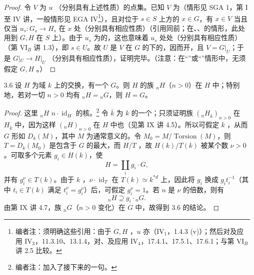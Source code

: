 \begin{proof}
令 $V$ 为 $u$ （分别具有上述性质）的点集。已知 $V$ 为（情形见 SGA 1，第 I 至 IV 讲，一般情形见 EGA IV\footnote[14]{编者注：须明确这些引用：由于 $G,H$ ，$u$ 亦（IV$_1$，1.4.3 (v)）；然后对及应用 IV$_3$，11.3.10、13.1.4，对、及应用 IV$_4$，17.4.1、17.5.1、17.6.1；与第 VI$_B$ 讲 2.5 比较。}），且对位于 $s\in S$ 上方的 $x\in G$，有 $x\in V$ 当且仅当 $u_s:G_s\to H_s$ 在 $x$ 处（分别具有相应性质）（引用同前；在、、的情形，此处用到 $G,H$ 在 $S$ 上）。由于 $u_s$ 为的，这也意味着 $u_s$ 处处（分别具有相应性质）（第 VI$_B$ 讲 1.3），即 $s\in U$。故 $U$ 是 $V$ 在 $G$ 的下的，因而开，且 $V=G|_U$；于是 $G|_U\to H|_U$ （分别具有相应性质），证明完毕。（注意：在“”或“”情形中，无须假定 $G,H$ 。）
\end{proof}
\begin{SGAresult}{}{3.6}
设 $H$ 为域 $k$ 上的交换，有一个 $G$。则 $H$ 的族 ${}_nH$（$n>0$）在 $H$ 中；特别地，若对一切 $n>0$ 均有 ${}_nH={}_nG$，则 $H=G$。
\end{SGAresult}
\begin{proof}
这里 ${}_nH$  $n\cdot\operatorname{id}_H$ 的核。\footnote[15]{编者注：加入了接下来的一句。} 令 $\bar k$ 为 $k$ 的一个；只须证明族 $({}_nH_{\bar k})_{n>0}$ 在 $H_{\bar k}$ 中，因为这样 $({}_nH)_{n>0}$ 在 $H$ 中也（见第 IX 讲 4.5）。所以可假定 $k$ ，从而 $G$ 形如 $D_k(M)$，其中 $M$ 为通常意义的。令 $M_0=M/\operatorname{Torsion}(M)$，则 $T=D_k(M_0)$ 是包含于 $G$ 的最大，而 $H/T$ ，故 $H(k)/T(k)$ 被某个数 $\nu>0$ 。可取多个元素 $g_i\in H(k)$，使
\[
H=\coprod_i g_i\cdot G,
\]
并有 $g_i^\nu\in T(k)$。由于 $k$ ，$\nu\cdot\operatorname{id}_T$ 在 $T(k)\simeq k^{*d}$ 上，因此将 $g_i$ 换成 $g_it_i^{-1}$（其中 $t_i\in T(k)$ 满足 $t_i^\nu=g_i^\nu$）后，可假定 $g_i^\nu=1$。若 $n$ 是 $\nu$ 的倍数，则有
\[
{}_nH\supseteq g_i\cdot{}_nG.
\]
由第 IX 讲 4.7，族 ${}_nG$（$n>0$ 变化）在 $G$ 中，故得到 3.6 的结论。
\end{proof}
